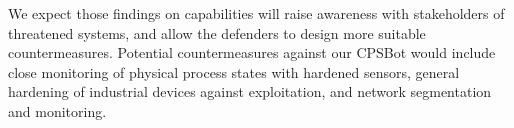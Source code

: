 \documentclass[sigconf]{acmart}
\makeatletter
\newcommand{\Botnet}{CPSBot\@\xspace}
\makeatother
\begin{document}
We expect those findings on capabilities will raise awareness with
stakeholders of threatened systems, and allow the defenders to design
more suitable countermeasures. Potential countermeasures against our
\Botnet would include close monitoring of physical process states with
hardened sensors, general hardening of industrial devices against
exploitation, and network segmentation and monitoring.






\balance










\end{document}
